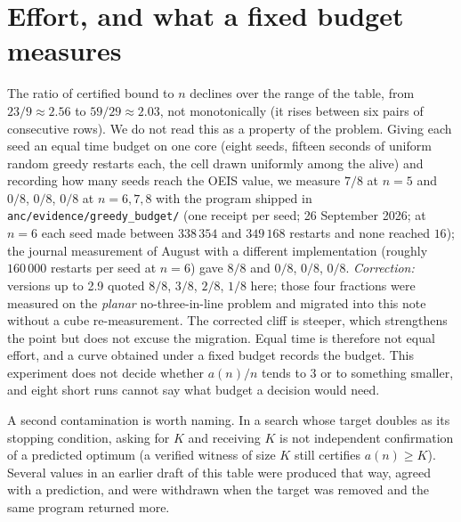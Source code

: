 \documentclass[11pt,a4paper]{article}
\begin{document}
\section{Effort, and what a fixed budget measures}\label{s:effort}
The ratio of certified bound to $n$ declines over the range of the table, from $23/9\approx2.56$ to $59/29\approx2.03$, not
monotonically (it rises between six pairs of consecutive rows).  We do not read this as a property of the problem.  Giving each seed an equal time budget on one core (eight seeds, fifteen seconds of uniform random
greedy restarts each, the cell drawn uniformly among the alive) and recording how many seeds reach
the OEIS value, we measure $7/8$ at $n=5$ and $0/8$, $0/8$, $0/8$ at $n=6,7,8$ with the program shipped in
\texttt{anc/evidence/greedy\_budget/} (one receipt per seed; 26 September 2026; at $n=6$ each seed made
between $338\,354$ and $349\,168$ restarts and none reached $16$); the journal measurement of August with a different
implementation (roughly $160\,000$ restarts per seed at $n=6$) gave $8/8$ and $0/8$, $0/8$, $0/8$.  \emph{Correction:} versions up to 2.9 quoted
$8/8$, $3/8$, $2/8$, $1/8$ here; those four fractions were measured on the \emph{planar}
no-three-in-line problem and migrated into this note without a cube re-measurement.  The corrected
cliff is steeper, which strengthens the point but does not excuse the migration.
Equal time is therefore not equal effort, and a curve obtained under a fixed budget records the
budget.  This experiment does not decide whether $a(n)/n$ tends to $3$ or to something smaller,
and eight short runs cannot say what budget a decision would need.

A second contamination is worth naming.  In a search whose target doubles as its stopping
condition, asking for $K$ and receiving $K$ is not independent confirmation of a predicted optimum
(a verified witness of size $K$ still certifies $a(n)\ge K$).  Several values in an
earlier draft of this table were produced that way, agreed with a prediction, and were withdrawn
when the target was removed and the same program returned more.
\end{document}
